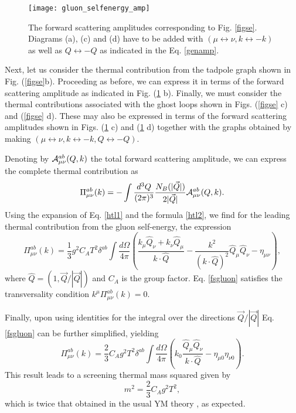 \documentclass[longbibliography,groupedaddress,showpacs,showkeys,amssymb,eqsecnum,aps,nofootinbib,superscriptaddress]{revtex4}
\newcommand{\be}{\begin{equation}}
\newcommand{\ee}{\end{equation}}
\begin{document}
\begin{figure}[t!]
    \texttt{[image: gluon\_selfenergy\_amp]}
    \caption{The forward scattering amplitudes corresponding to Fig. \ref{figse}.
Diagrams (a), (c) and (d) have to be added with
$(\mu\leftrightarrow\nu,k\leftrightarrow-k)$
as well as $Q\leftrightarrow -Q$ as indicated in the Eq. \eqref{genamp}.}
\label{figseamp}
\end{figure}

Next, let us consider the thermal contribution from the tadpole graph
shown in Fig. (\ref{figse}b). Proceeding as before, we can express it
in terms  of the forward scattering amplitude 
as indicated in Fig. (\ref{figseamp} b).          
Finally, we must consider the thermal contributions  associated with
the ghost loops shown in Figs. (\ref{figse} c) and (\ref{figse} d).           
These may also be expressed in terms of the forward scattering
amplitudes   shown in Figs. (\ref{figseamp} c) and (\ref{figseamp} d)
together with the graphs obtained by making  
$(\mu\leftrightarrow\nu,k\leftrightarrow-k, Q \leftrightarrow -Q)$.
     
Denoting by ${\cal A}^{ab}_{\mu\nu}(Q,k)$ 
the total forward scattering amplitude,  
we can express the complete thermal contribution 
as
\be 
\Pi^{ab}_{\mu\nu}(k) = - \int \frac{d^3 Q}{(2\pi)^3}
\frac{N_B(|\vec Q|)}{2|\vec Q|} 
{\cal A}^{ab}_{\mu\nu}(Q,k)
.
\ee
Using the expansion of Eq. \eqref{htl1} and the formula \eqref{htl2},
we find for the leading thermal contribution from the gluon
self-energy, the expression %
\be\label{fsgluon}
\Pi^{ab}_{\mu\nu}(k) = \frac 1 3 g^2 C_A T^2 \delta^{ab}  
\int\frac{d\Omega}{4\pi}
\left(
 \frac{k_\mu \hat Q_\nu+k_\nu \hat Q_\mu}{k\cdot\hat Q}
- \frac{k^2}{(k\cdot \hat Q)^2} \hat Q_\mu \hat Q_\nu 
-\eta_{\mu\nu} 
\right) ,
\ee
where ${\hat Q} = (1,{\vec Q}/{|\vec Q|})$ and $C_A$ is the group factor. 
Eq. \eqref{fsgluon} satisfies the transversality condition $k^\mu \Pi^{ab}_{\mu\nu}(k) = 0$.

Finally, upon using identities for the integral over the directions $\vec Q/|\vec Q|$ 
Eq. \eqref{fsgluon} can be further simplified, yielding \cite{Brandt:1993mj}
\be 
\Pi^{ab}_{\mu\nu}(k) = \frac 2 3 C_A g^2 T^2\delta^{ab} \int\frac{d\Omega}{4\pi}
\left(k_0
\frac{{\hat Q}_\mu {\hat Q}_\nu}{k\cdot{\hat Q}} -
\eta_{\mu 0}\eta_{\nu 0}
\right) .
\ee
This result 
leads to a 
screening thermal mass
squared given by 
\be 
m^2 = \frac 2 3 C_A g^2 T^2, %
\ee 
which is twice that obtained in the usual YM theory 
\cite{lebellac:book96}, as expected.
\end{document}
